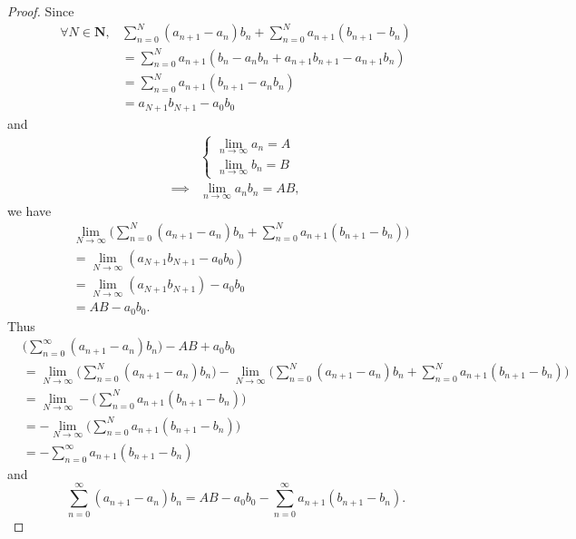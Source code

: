 \begin{proof}
    Since
    \begin{align*}
        \forall N \in \mathbf{N}, & \sum_{n = 0}^N (a_{n + 1} - a_n) b_n + \sum_{n = 0}^N a_{n + 1} (b_{n + 1} - b_n) \\
                                  & = \sum_{n = 0}^N a_{n + 1} (b_n - a_n b_n + a_{n + 1} b_{n + 1} - a_{n + 1} b_n)  \\
                                  & = \sum_{n = 0}^N a_{n + 1} (b_{n + 1} - a_n b_n)                                  \\
                                  & = a_{N + 1} b_{N + 1} - a_0 b_0
    \end{align*}
    and
    \begin{align*}
                 & \begin{cases}
                       \lim_{n \to \infty} a_n = A \\
                       \lim_{n \to \infty} b_n = B
                   \end{cases}       \\
        \implies & \lim_{n \to \infty} a_n b_n = AB,
    \end{align*}
    we have
    \begin{align*}
         & \lim_{N \to \infty} \bigg(\sum_{n = 0}^N (a_{n + 1} - a_n) b_n + \sum_{n = 0}^N a_{n + 1} (b_{n + 1} - b_n)\bigg) \\
         & = \lim_{N \to \infty} (a_{N + 1} b_{N + 1} - a_0 b_0)                                                             \\
         & = \lim_{N \to \infty} (a_{N + 1} b_{N + 1}) - a_0 b_0                                                             \\
         & = AB - a_0 b_0.
    \end{align*}
    Thus
    \begin{align*}
         & \bigg(\sum_{n = 0}^\infty (a_{n + 1} - a_n) b_n\bigg) - AB + a_0 b_0                                                                                                                       \\
         & = \lim_{N \to \infty} \bigg(\sum_{n = 0}^N (a_{n + 1} - a_n) b_n\bigg) - \lim_{N \to \infty} \bigg(\sum_{n = 0}^N (a_{n + 1} - a_n) b_n + \sum_{n = 0}^N a_{n + 1} (b_{n + 1} - b_n)\bigg) \\
         & = \lim_{N \to \infty} - \bigg(\sum_{n = 0}^N a_{n + 1} (b_{n + 1} - b_n)\bigg)                                                                                                             \\
         & = - \lim_{N \to \infty} \bigg(\sum_{n = 0}^N a_{n + 1} (b_{n + 1} - b_n)\bigg)                                                                                                             \\
         & = - \sum_{n = 0}^\infty a_{n + 1} (b_{n + 1} - b_n)
    \end{align*}
    and
    \[
        \sum_{n = 0}^\infty (a_{n + 1} - a_n) b_n = AB - a_0 b_0 - \sum_{n = 0}^\infty a_{n + 1} (b_{n + 1} - b_n).
    \]
\end{proof}

